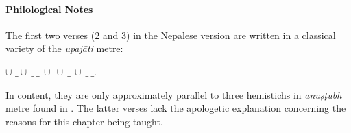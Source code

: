             \paragraph{Philological Notes}
            The first two verses (2 and 3) in the Nepalese version are written in a classical 
            variety of the \emph{upajāti} metre: 
            \begin{center}
                \underline{$\cup$} $\_ \cup\ \_\ \_\ \cup\ \cup\ \_\ \cup\ \_\ \_$.
            \end{center} 
            In content, they are only approximately parallel to three hemistichs in 
            \emph{anuṣṭubh} metre found in \cite{vulgate}. The latter verses lack the 
            apologetic explanation concerning the reasons for this chapter being taught.

